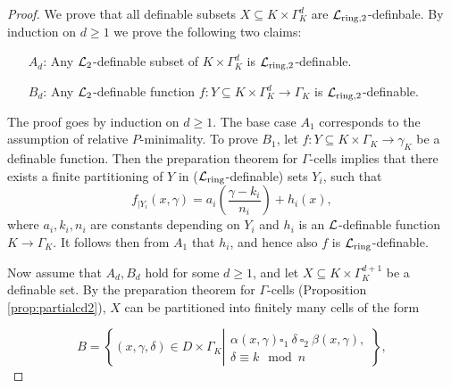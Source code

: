 \begin{proof} We prove that all definable subsets $X\subseteq K\times \Gamma_K^d$ are $\mathcal{L}_{\text{ring,2}}$-definbale. By induction on $d\geq 1$ we prove the following two claims:
\begin{enumerate}
\item[$A_d$:] Any $\mathcal{L}_2$-definable subset of $K \times \Gamma_K^d$ is $\mathcal{L}_{\text{ring,2}}$-definable.
\item[$B_d$:] Any $\mathcal{L}_2$-definable function $f: Y \subseteq K\times\Gamma_K^d \to \Gamma_K$ is $\mathcal{L}_{\text{ring,2}}$-definable.
\end{enumerate}
The proof goes by induction on $d\geq 1$. The base case $A_1$ corresponds to the assumption of relative $P$-minimality. To prove $B_1$, let 
$f: Y \subseteq K\times\Gamma_K \to \gamma_K$ be a definable function. Then the preparation theorem for $\Gamma$-cells implies that there exists a finite partitioning of $Y$ in ($\mathcal{L}_{\text{ring}}$-definable) sets $Y_i$, such that
\[f_{|Y_i}(x, \gamma) = a_i \left(\frac{\gamma -k_i}{n_i}\right) + h_i(x),\] where $a_i, k_i,n_i$ are constants depending on $Y_i$ and $h_i$ is an $\mathcal{L}$-definable function $K \to \Gamma_K$. It follows then from $A_1$ that $h_i$, and hence also $f$ is $\mathcal{L}_{\text{ring}}$-definable. 

Now assume that $A_d, B_d$ hold for some $d \geqslant 1$,  and let $X\subseteq K\times \Gamma_K^{d+1}$ be a definable set. By the preparation theorem for $\Gamma$-cells (Proposition \ref{prop:partialcd2}), $X$ can be partitioned into finitely many cells of the form 

\[B= \left\{(x,\gamma,\delta)\in D\times\Gamma_K \left|\begin{array}{l} \alpha(x,\gamma) \square_1 \ \delta \ \square_2 \ \beta(x,\gamma), \\
\delta \equiv k\mod n \end{array}\right\}\right.,\]


\end{proof}
